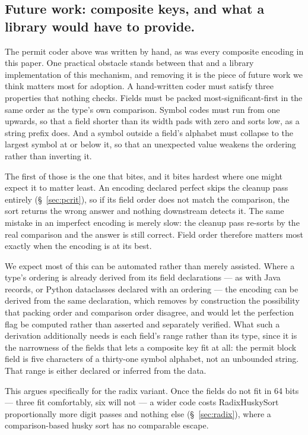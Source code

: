 \documentclass[twoside,leqno,twocolumn]{article}
\begin{document}
\subsection{Future work: composite keys, and what a library would have to provide.}
\label{sec:composite-future}

The permit coder above was written by hand, as was every composite encoding in this paper.
One practical obstacle stands between that and a library implementation of this mechanism,
and removing it is the piece of future work we think matters most for adoption.
A hand-written coder must satisfy three properties that nothing checks.
Fields must be packed most-significant-first in the same order as the type's own comparison.
Symbol codes must run from one upwards, so that a field shorter than its width pads with zero and
sorts low, as a string prefix does.
And a symbol outside a field's alphabet must collapse to the largest symbol at or below it,
so that an unexpected value weakens the ordering rather than inverting it.

The first of those is the one that bites, and it bites hardest where one might expect it to matter
least.
An encoding declared perfect skips the cleanup pass entirely (\S~\ref{sec:pcrit}),
so if its field order does not match the comparison, the sort returns the wrong answer and nothing
downstream detects it.
The same mistake in an imperfect encoding is merely slow: the cleanup pass re-sorts by the real
comparison and the answer is still correct.
Field order therefore matters most exactly when the encoding is at its best.

We expect most of this can be automated rather than merely assisted.
Where a type's ordering is already derived from its field declarations ---
as with Java records, or Python dataclasses declared with an ordering ---
the encoding can be derived from the same declaration,
which removes by construction the possibility that packing order and comparison order disagree,
and would let the perfection flag be computed rather than asserted and separately verified.
What such a derivation additionally needs is each field's range rather than its type,
since it is the narrowness of the fields that lets a composite key fit at all:
the permit block field is five characters of a thirty-one symbol alphabet, not an unbounded string.
That range is either declared or inferred from the data.

This argues specifically for the radix variant.
Once the fields do not fit in 64 bits --- three fit comfortably, six will not ---
a wider code costs RadixHuskySort proportionally more digit passes and nothing else (\S~\ref{sec:radix}),
where a comparison-based husky sort has no comparable escape.
\end{document}
